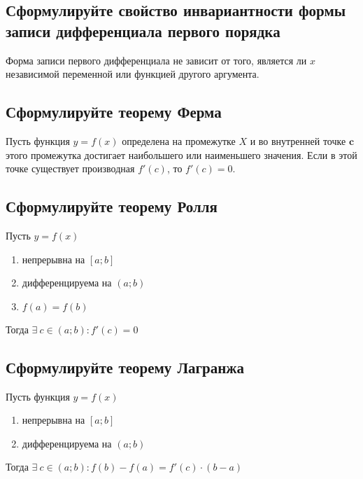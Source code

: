 \subsection{Сформулируйте свойство инвариантности формы записи дифференциала первого порядка}
\begin{theorem}
	Форма записи первого дифференциала не зависит от того, является ли $x$ независимой переменной или функцией другого аргумента.
\end{theorem}
\newpage
\subsection{Сформулируйте теорему Ферма}
\begin{theorem}
	Пусть функция $y=f(x)$ определена на промежутке $X$ и во внутренней точке $\bm{c}$ этого промежутка достигает наибольшего или наименьшего значения. Если в этой точке существует производная $f'(c)$, то $f'(c) = 0$.
\end{theorem}

\subsection{Сформулируйте теорему Ролля}
\begin{theorem}
	Пусть $y=f(x)$
	\begin{enumerate}
		\item непрерывна на $[a;b]$
		\item дифференцируема на $(a;b)$
		\item $f(a) = f(b)$
	\end{enumerate}
	Тогда $\exists\ c \in (a;b)\colon f'(c) = 0$
\end{theorem}
\subsection{Сформулируйте теорему Лагранжа}
\begin{theorem}
	Пусть функция $y=f(x)$
	\begin{enumerate}
		\item непрерывна на $[a;b]$
		\item дифференцируема на $(a;b)$
	\end{enumerate}
	Тогда $\exists\ c \in (a;b)\colon \boxed{f(b) - f(a) = f'(c) \cdot (b-a)}$
\end{theorem}

